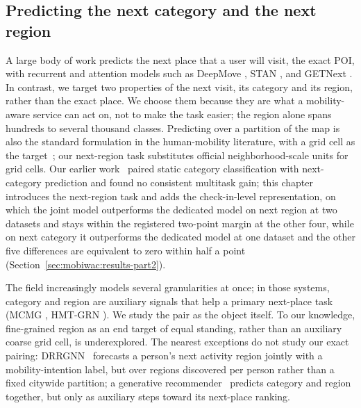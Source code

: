 \subsection{Predicting the next category and the next region}
\label{sec:mobiwac:related-tasks}
A large body of work predicts the next place that a user will visit, the exact POI,
with recurrent and attention models such as DeepMove \cite{feng2018deepmove}, STAN
\cite{luo2021stan}, and GETNext \cite{yang2022getnext}. In contrast, we target two properties of the next visit, its category and its
region, rather than the exact place. We choose them because they are
what a mobility-aware service can act on, not to make the task easier; the region
alone spans hundreds to several thousand classes. Predicting
over a partition of the map is also the standard formulation in the human-mobility
literature, with a grid cell as the target~\cite{luca2021mobilitysurvey}; our
next-region task substitutes official neighborhood-scale units for grid cells. Our earlier
work~\cite{silva2025mtlnet} paired static category classification with next-category prediction
and found no consistent multitask gain; this chapter introduces the next-region task and adds the check-in-level
representation, on which the joint model outperforms the dedicated model on next region at two
datasets and stays within the registered two-point margin at the other four, while on next
category it outperforms the dedicated model at one dataset and the other five differences are
equivalent to zero within half a point (Section~\ref{sec:mobiwac:results-part2}).

The field
increasingly models several granularities at once; in those systems, category and
region are auxiliary signals that help a primary next-place task
(MCMG \cite{sun2024mcmg}, HMT-GRN \cite{Lim2022}).
We study the pair as the object itself. To our knowledge, fine-grained region as an
end target of equal standing, rather than an auxiliary coarse grid cell, is
underexplored.
The nearest exceptions do not study our exact pairing:
DRRGNN~\cite{zhu2022drrgnn} forecasts a person's next activity region jointly
with a mobility-intention label, but over regions discovered per person rather
than a fixed citywide partition; a generative recommender~\cite{sun2025kgtb}
predicts category and region together, but only as auxiliary steps toward its
next-place ranking.


